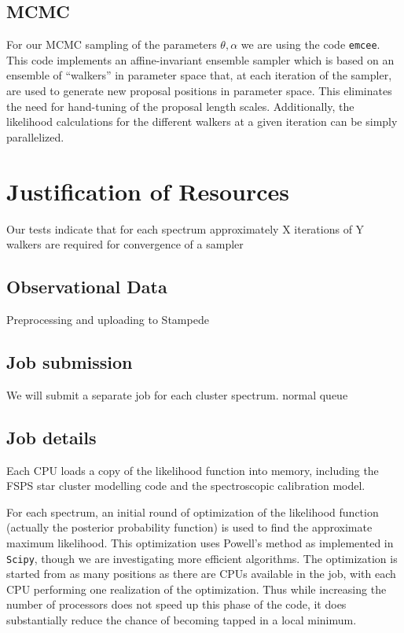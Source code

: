 \documentclass[11pt,preprint]{aastex}
\begin{document}
\subsection{MCMC}
For our MCMC sampling of the parameters ${\theta, \alpha}$ we are using the code \texttt{emcee}.  
This code implements an affine-invariant ensemble sampler \citep{goodman_weare} which is based on an ensemble of ``walkers'' in parameter space that, at each iteration of the sampler, are used to generate new proposal positions in parameter space.  
This eliminates the need for hand-tuning of the proposal length scales.  
Additionally, the likelihood calculations for the different walkers at a given iteration can be simply parallelized.


\section{Justification of Resources}
Our tests indicate that for each spectrum approximately X iterations of Y walkers are required for convergence of a sampler

\subsection{Observational Data}
Preprocessing and uploading to Stampede

\subsection{Job submission}
We will submit a separate job for each cluster spectrum. normal queue

\subsection{Job details}
Each CPU loads a copy of the likelihood function into memory, including the FSPS star cluster modelling code and the spectroscopic calibration model.

For each spectrum, an initial round of optimization of the likelihood function (actually the posterior probability function) is used to find the approximate maximum likelihood. 
This optimization uses Powell's method as implemented in \texttt{Scipy}, though we are investigating more efficient algorithms. 
The optimization is started from as many positions as there are CPUs available in the job, with each CPU  performing one realization of the optimization.  
Thus while increasing the number of processors does not speed up this phase of the code, it does substantially reduce the chance of becoming tapped in a local minimum.
\end{document}
